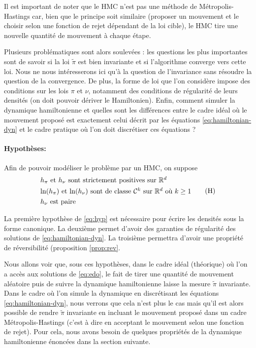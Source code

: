 \documentclass[10pt,a4paper]{article}
\begin{document}
Il est important de noter que le HMC n'est pas une méthode de Métropolis-Hastings car, bien que le principe soit similaire (proposer un mouvement et le choisir selon une fonction de rejet dépendant de la loi cible), le HMC tire une nouvelle quantité de mouvement à chaque étape.

Plusieurs problématiques sont alors soulevées : les questions les plus importantes sont de savoir si la loi $\widetilde{\pi}$ est bien invariante et si l'algorithme converge vers cette loi. Nous ne nous intéresserons ici qu'à la question de l'invariance sans résoudre la question de la convergence. De plus, la forme de loi que l'on considère impose des conditions sur les lois $\pi$ et $\nu$, notamment des conditions de régularité de leurs densités (on doit pouvoir dériver le Hamiltonien). Enfin, comment simuler la dynamique hamiltonienne et quelles sont les différences entre le cadre idéal où le mouvement proposé est exactement celui décrit par les équations \eqref{eq:hamiltonian-dyn} et le cadre pratique où l'on doit discrétiser ces équations ?

\paragraph{Hypothèses:}
Afin de pouvoir modéliser le problème par un HMC, on suppose
\begin{equation}\label{eq:hyp}
	\begin{aligned}
		&\mbox{$h_\pi$ et $h_\nu$ sont strictement positives sur $\mathbb{R}^d$} \\
		&\mbox{$\ln(h_\pi)$ et $\ln(h_\nu)$ sont de classe $\mathcal{C}^k$ sur $\mathbb{R}^d$ où $k \geq 1$}\\
		&\mbox{$h_\nu$ est paire}
	\end{aligned}
	\tag{H}
\end{equation}

\begin{Rque}
	La première hypothèse de \eqref{eq:hyp} est nécessaire pour écrire les densités sous la forme canonique. La deuxième permet d'avoir des garanties de régularité des solutions de \eqref{eq:hamiltonian-dyn}. La troisième permettra d'avoir une propriété de réversibilité (proposition \ref{prop:rev}.
\end{Rque}

Nous allons voir que, sous ces hypothèses, dans le cadre idéal (théorique) où l'on a accès aux solutions de \eqref{eq:edo}, le fait de tirer une quantité de mouvement aléatoire puis de suivre la dynamique hamiltonienne laisse la mesure $\tilde{\pi}$ invariante. Dans le cadre où l'on simule la dynamique en discrétisant les équations \eqref{eq:hamiltonian-dyn}, nous verrons que cela n'est plus le cas mais qu'il est alors possible de rendre $\tilde{\pi}$ invariante en incluant le mouvement proposé dans un cadre Métropolis-Hastings (c'est à dire en acceptant le mouvement selon une fonction de rejet). Pour cela, nous avons besoin de quelques propriétés de la dynamique hamiltonienne énoncées dans la section suivante.
\end{document}
